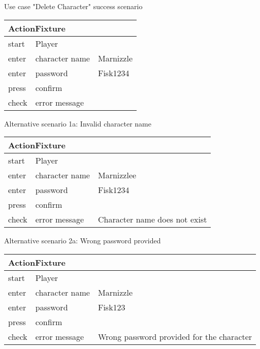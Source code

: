 
\noindent Use case "Delete Character" success scenario

\vspace{0.4cm}
\begin{tabular}{| p{2cm} | p{5.5cm} | p{5.5cm} |} \hline
\multicolumn{3}{|l|}{ActionFixture} \\ \hline
start & Player &  \\ \hline
enter & character name & Marnizzle \\ \hline
enter & password & Fisk1234 \\ \hline
press & confirm &  \\ \hline
check & error message &  \\ \hline
\end{tabular}
\vspace{0.8cm}

\noindent Alternative scenario 1a: Invalid character name

\vspace{0.4cm}
\begin{tabular}{| p{2cm} | p{5.5cm} | p{5.5cm} |} \hline
\multicolumn{3}{|l|}{ActionFixture} \\ \hline
start & Player &  \\ \hline
enter & character name & Marnizzlee \\ \hline
enter & password & Fisk1234 \\ \hline
press & confirm &  \\ \hline
check & error message & Character name does not exist \\ \hline
\end{tabular}
\vspace{0.8cm}

\noindent Alternative scenario 2a: Wrong password provided

\vspace{0.4cm}
\begin{tabular}{| p{2cm} | p{5.5cm} | p{5.5cm} |} \hline
\multicolumn{3}{|l|}{ActionFixture} \\ \hline
start & Player &  \\ \hline
enter & character name & Marnizzle \\ \hline
enter & password & Fisk123 \\ \hline
press & confirm &  \\ \hline
check & error message & Wrong password provided for the character \\ \hline
\end{tabular}
\vspace{0.8cm}

